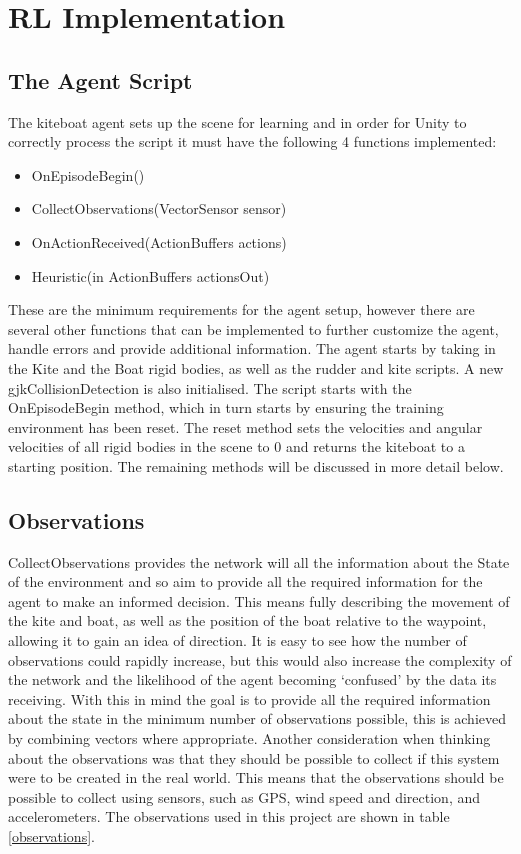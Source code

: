\section{RL Implementation}\label{sec:RL_Implementation}
\subsection{The Agent Script}
The kiteboat agent sets up the scene for learning and in order for Unity to correctly process the script it must have the following 4 functions implemented:
\begin{itemize}
    \item OnEpisodeBegin()
    \item CollectObservations(VectorSensor sensor)
    \item OnActionReceived(ActionBuffers actions)
    \item Heuristic(in ActionBuffers actionsOut)
\end{itemize}

These are the minimum requirements for the agent setup, however there are several other functions that can be implemented to further customize the agent, handle errors and provide additional information. The agent starts by taking in the Kite and the Boat rigid bodies, as well as the rudder and kite scripts. A new gjkCollisionDetection is also initialised. The script starts with the OnEpisodeBegin method, which in turn starts by ensuring the training environment has been reset. The reset method sets the velocities and angular velocities of all rigid bodies in the scene to 0 and returns the kiteboat to a starting position. The remaining methods will be discussed in more detail below.
\subsection{Observations}
CollectObservations provides the network will all the information about the State of the environment and so aim to provide all the required information for the agent to make an informed decision. This means fully describing the movement of the kite and boat, as well as the position of the boat relative to the waypoint, allowing it to gain an idea of direction. It is easy to see how the number of observations could rapidly increase, but this would also increase the complexity of the network and the likelihood of the agent becoming `confused' by the data its receiving. With this in mind the goal is to provide all the required information about the state in the minimum number of observations possible, this is achieved by combining vectors where appropriate. Another consideration when thinking about the observations was that they should be possible to collect if this system were to be created in the real world. This means that the observations should be possible to collect using sensors, such as GPS, wind speed and direction, and accelerometers. The observations used in this project are shown in table$~$\ref{observations}.

